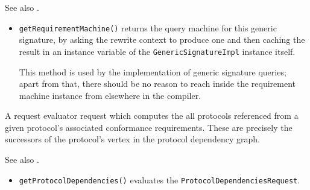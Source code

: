 \documentclass[../generics]{subfiles}
\begin{document}
See also .
\begin{itemize}
\item \texttt{getRequirementMachine()} returns the query machine for this generic signature, by asking the rewrite context to produce one and then caching the result in an instance variable of the \texttt{GenericSignatureImpl} instance itself.

This method is used by the implementation of generic signature queries; apart from that, there should be no reason to reach inside the requirement machine instance from elsewhere in the compiler.
\end{itemize}

A request evaluator request which computes the  all protocols referenced from a given protocol's associated conformance requirements. These are precisely the successors of the protocol's vertex in the protocol dependency graph.

See also .
\begin{itemize}
\item \texttt{getProtocolDependencies()} evaluates the \texttt{ProtocolDependenciesRequest}.
\end{itemize}
\end{document}
